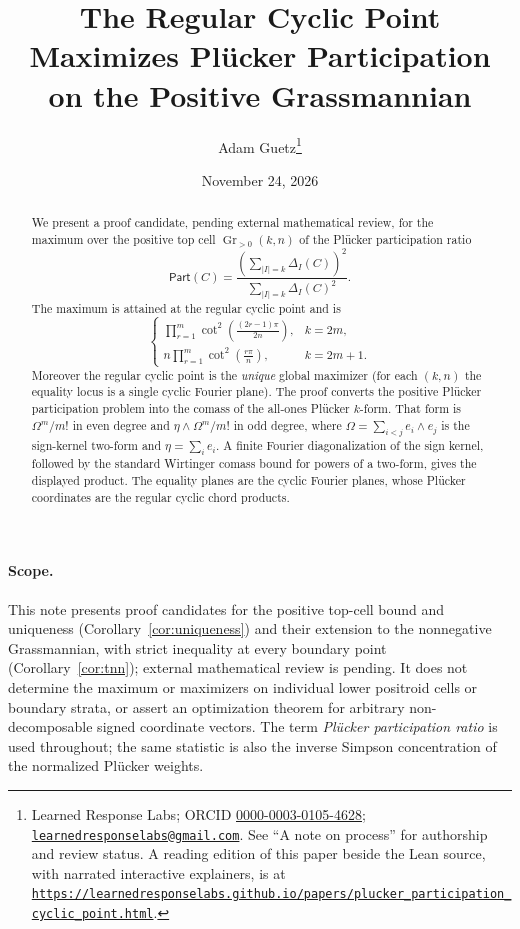 \documentclass[11pt]{article}
\title{The Regular Cyclic Point Maximizes Plücker Participation on the Positive Grassmannian}
\author{Adam Guetz\thanks{Learned Response Labs; ORCID \href{https://orcid.org/0000-0003-0105-4628}{0000-0003-0105-4628}; \texttt{\href{mailto:learnedresponselabs@gmail.com}{learnedresponselabs@gmail.com}}. See ``A note on process'' for authorship and review status. A reading edition of this paper beside the Lean source, with narrated interactive explainers, is at \href{https://learnedresponselabs.github.io/papers/plucker_participation_cyclic_point.html}{\mbox{\nolinkurl{https://learnedresponselabs.github.io/papers/plucker_participation_cyclic_point.html}}}.}}
\date{November 24, 2026}
\newcommand{\Gr}{\operatorname{Gr}}
\newcommand{\Part}{\mathsf{Part}}
\begin{document}
\maketitle

\begin{abstract}
We present a proof candidate, pending external mathematical review, for the
maximum over the positive top cell \(\Gr_{>0}(k,n)\) of the
Plücker participation ratio
\[
  \Part(C)=
  \frac{\left(\sum_{|I|=k}\Delta_I(C)\right)^2}
       {\sum_{|I|=k}\Delta_I(C)^2}.
\]
The maximum is attained at the regular cyclic point and is
\[
  \begin{cases}
  \displaystyle
  \prod_{r=1}^{m}\cot^2\!\left(\frac{(2r-1)\pi}{2n}\right),
  & k=2m,\\[1.2em]
  \displaystyle
  n\prod_{r=1}^{m}\cot^2\!\left(\frac{r\pi}{n}\right),
  & k=2m+1.
  \end{cases}
\]
Moreover the regular cyclic point is the \emph{unique} global maximizer (for
each \((k,n)\) the equality locus is a single cyclic Fourier plane).
The proof converts the positive Plücker participation problem into the comass
of the all-ones Plücker \(k\)-form.  That form is
\(\Omega^m/m!\) in even degree and \(\eta\wedge\Omega^m/m!\) in odd degree,
where \(\Omega=\sum_{i<j} e_i\wedge e_j\) is the sign-kernel two-form and
\(\eta=\sum_i e_i\).  A finite Fourier diagonalization of the sign kernel,
followed by the standard Wirtinger comass bound for powers of a two-form, gives
the displayed product.  The equality planes are the cyclic Fourier planes,
whose Plücker coordinates are the regular cyclic chord products.
\end{abstract}

\paragraph{Scope.}
This note presents proof candidates for the positive top-cell bound and
uniqueness (Corollary~\ref{cor:uniqueness}) and their extension to the
nonnegative Grassmannian, with strict inequality at every boundary point
(Corollary~\ref{cor:tnn}); external mathematical review is pending. It does
not determine the maximum or maximizers on individual lower positroid cells
or boundary strata, or assert an optimization theorem for arbitrary
non-decomposable signed coordinate vectors.  The term
\emph{Plücker participation ratio} is used throughout; the same statistic is
also the inverse Simpson concentration of the normalized Plücker weights.
\end{document}
